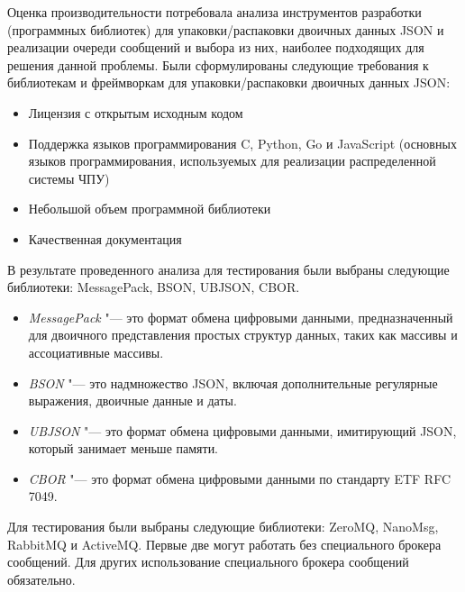 Оценка производительности потребовала анализа инструментов разработки (программных библиотек) для упаковки/распаковки двоичных данных JSON и реализации очереди сообщений и выбора из них, наиболее подходящих для решения данной проблемы. Были сформулированы следующие требования к библиотекам и фреймворкам для упаковки/распаковки двоичных данных JSON:

\begin{itemize}
	\item Лицензия с открытым исходным кодом
	\item Поддержка языков программирования C, Python, Go и JavaScript (основных языков программирования, используемых для реализации распределенной системы ЧПУ)
	\item Небольшой объем программной библиотеки
	\item Качественная документация
\end{itemize}


В результате проведенного анализа для тестирования были выбраны следующие библиотеки: MessagePack, BSON, UBJSON, CBOR.

\begin{itemize}
	\item \textit{MessagePack} "--- это формат обмена цифровыми данными, предназначенный для двоичного представления простых структур данных, таких как массивы и ассоциативные массивы.
	\item \textit{BSON} "--- это надмножество JSON, включая дополнительные регулярные выражения, двоичные данные и даты.
	\item \textit{UBJSON} "--- это формат обмена цифровыми данными, имитирующий JSON, который занимает меньше памяти.
	\item \textit{CBOR} "--- это формат обмена цифровыми данными по стандарту ETF RFC 7049.
\end{itemize}


Для тестирования были выбраны следующие библиотеки: ZeroMQ, NanoMsg, RabbitMQ и ActiveMQ. Первые две могут работать без специального брокера сообщений. Для других использование специального брокера сообщений обязательно.

